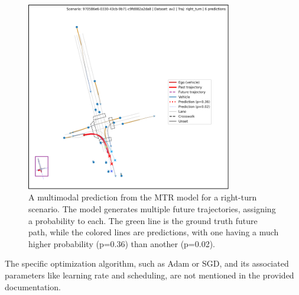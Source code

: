 \begin{figure}[htbp]
    \centering
    \includegraphics[width=0.8\textwidth]{figures/input_output_viz_ugly.png}
    \caption{A multimodal prediction from the MTR model for a right-turn scenario. The model generates multiple future trajectories, assigning a probability to each. The green line is the ground truth future path, while the colored lines are predictions, with one having a much higher probability (p=0.36) than another (p=0.02).}
    \label{fig:mtr_prediction}
\end{figure}
 
The specific optimization algorithm, such as Adam or SGD, and its associated parameters like learning rate and scheduling, are not mentioned in the provided documentation.
 
